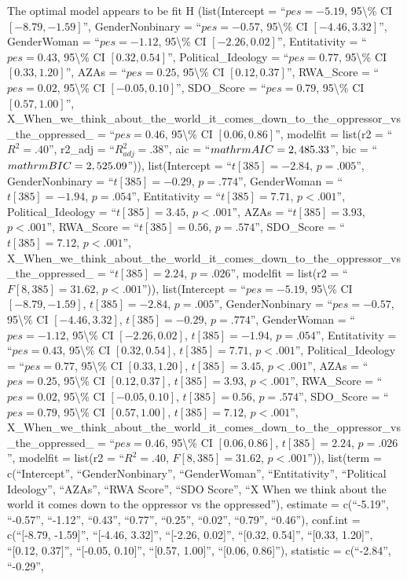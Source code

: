 \documentclass[
  doc,draftall]{apa6}
\begin{document}
The optimal model appears to be fit H (list(Intercept = ``\(pes = -5.19\), 95\textbackslash\% CI \([-8.79, -1.59]\)'', GenderNonbinary = ``\(pes = -0.57\), 95\textbackslash\% CI \([-4.46, 3.32]\)'', GenderWoman = ``\(pes = -1.12\), 95\textbackslash\% CI \([-2.26, 0.02]\)'', Entitativity = ``\(pes = 0.43\), 95\textbackslash\% CI \([0.32, 0.54]\)'', Political\_Ideology = ``\(pes = 0.77\), 95\textbackslash\% CI \([0.33, 1.20]\)'', AZAs = ``\(pes = 0.25\), 95\textbackslash\% CI \([0.12, 0.37]\)'', RWA\_Score = ``\(pes = 0.02\), 95\textbackslash\% CI \([-0.05, 0.10]\)'', SDO\_Score = ``\(pes = 0.79\), 95\textbackslash\% CI \([0.57, 1.00]\)'', X\_When\_we\_think\_about\_the\_world\_it\_comes\_down\_to\_the\_oppressor\_vs\_the\_oppressed\_ = ``\(pes = 0.46\), 95\textbackslash\% CI \([0.06, 0.86]\)'',
modelfit = list(r2 = ``\(R^2 = .40\)'', r2\_adj = ``\(R^2_{adj} = .38\)'', aic = ``\(\\mathrm{AIC} = 2,485.33\)'', bic = ``\(\\mathrm{BIC} = 2,525.09\)'')), list(Intercept = ``\(t[385] = -2.84\), \(p = .005\)'', GenderNonbinary = ``\(t[385] = -0.29\), \(p = .774\)'', GenderWoman = ``\(t[385] = -1.94\), \(p = .054\)'', Entitativity = ``\(t[385] = 7.71\), \(p < .001\)'', Political\_Ideology = ``\(t[385] = 3.45\), \(p < .001\)'', AZAs = ``\(t[385] = 3.93\), \(p < .001\)'', RWA\_Score = ``\(t[385] = 0.56\), \(p = .574\)'', SDO\_Score = ``\(t[385] = 7.12\), \(p < .001\)'', X\_When\_we\_think\_about\_the\_world\_it\_comes\_down\_to\_the\_oppressor\_vs\_the\_oppressed\_ = ``\(t[385] = 2.24\), \(p = .026\)'', modelfit = list(r2 = ``\(F[8, 385] = 31.62\), \(p < .001\)'')), list(Intercept = ``\(pes = -5.19\), 95\textbackslash\% CI \([-8.79, -1.59]\), \(t[385] = -2.84\), \(p = .005\)'', GenderNonbinary = ``\(pes = -0.57\), 95\textbackslash\% CI \([-4.46, 3.32]\), \(t[385] = -0.29\), \(p = .774\)'', GenderWoman = ``\(pes = -1.12\), 95\textbackslash\% CI \([-2.26, 0.02]\), \(t[385] = -1.94\), \(p = .054\)'', Entitativity = ``\(pes = 0.43\), 95\textbackslash\% CI \([0.32, 0.54]\), \(t[385] = 7.71\), \(p < .001\)'', Political\_Ideology = ``\(pes = 0.77\), 95\textbackslash\% CI \([0.33, 1.20]\), \(t[385] = 3.45\), \(p < .001\)'', AZAs = ``\(pes = 0.25\), 95\textbackslash\% CI \([0.12, 0.37]\), \(t[385] = 3.93\), \(p < .001\)'',
RWA\_Score = ``\(pes = 0.02\), 95\textbackslash\% CI \([-0.05, 0.10]\), \(t[385] = 0.56\), \(p = .574\)'', SDO\_Score = ``\(pes = 0.79\), 95\textbackslash\% CI \([0.57, 1.00]\), \(t[385] = 7.12\), \(p < .001\)'', X\_When\_we\_think\_about\_the\_world\_it\_comes\_down\_to\_the\_oppressor\_vs\_the\_oppressed\_ = ``\(pes = 0.46\), 95\textbackslash\% CI \([0.06, 0.86]\), \(t[385] = 2.24\), \(p = .026\)'', modelfit = list(r2 = ``\(R^2 = .40\), \(F[8, 385] = 31.62\), \(p < .001\)'')), list(term = c(``Intercept'', ``GenderNonbinary'', ``GenderWoman'', ``Entitativity'', ``Political Ideology'', ``AZAs'', ``RWA Score'', ``SDO Score'', ``X When we think about the world it comes down to the oppressor vs the oppressed''), estimate = c(``-5.19'', ``-0.57'', ``-1.12'', ``0.43'', ``0.77'', ``0.25'', ``0.02'', ``0.79'', ``0.46''), conf.int = c(``{[}-8.79, -1.59{]}'', ``{[}-4.46, 3.32{]}'', ``{[}-2.26, 0.02{]}'', ``{[}0.32, 0.54{]}'', ``{[}0.33, 1.20{]}'', ``{[}0.12, 0.37{]}'', ``{[}-0.05, 0.10{]}'', ``{[}0.57, 1.00{]}'', ``{[}0.06, 0.86{]}''), statistic = c(``-2.84'', ``-0.29'',
\end{document}
